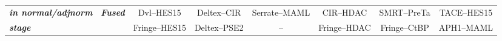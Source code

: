\documentclass[10pt]{article}
\begin{document}
\begin{table}
\begin{tabular}{|llcccccc|}
\multicolumn{1}{|l|}{\textit{\textbf{in normal/adjnorm}}}    & \multicolumn{1}{l|}{\textit{\textbf{Fused}}}     & \multicolumn{1}{c|}{Dvl--HES15}                                                                  & \multicolumn{1}{c|}{Deltex--CIR}  & \multicolumn{1}{c|}{Serrate--MAML}                                                              & \multicolumn{1}{c|}{CIR--HDAC}                                                                     & \multicolumn{1}{c|}{SMRT--PreTa}                                                                                 & TACE--HES15                                                                               \\ \cline{3-8}
\multicolumn{1}{|l|}{\textit{\textbf{stage}}}                & \multicolumn{1}{l|}{\textit{\textbf{}}}          & \multicolumn{1}{c|}{Fringe--HES15}                                                               & \multicolumn{1}{c|}{Deltex--PSE2} & \multicolumn{1}{c|}{--}                                                                            & \multicolumn{1}{c|}{Fringe--HDAC}                                                                  & \multicolumn{1}{c|}{Fringe--CtBP}                                                                                & APH1--MAML                                                                                \\ \hline

\end{tabular}
\end{table}
\end{document}
